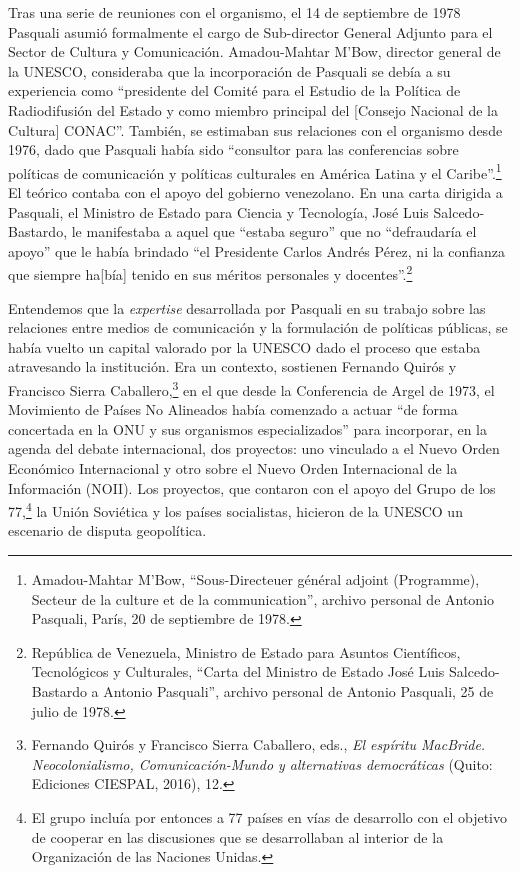 \documentclass{tufte-handout}
\begin{document}
Tras una serie de reuniones con el organismo, el 14 de septiembre de
1978 Pasquali asumió formalmente el cargo de Sub-director General
Adjunto para el Sector de Cultura y Comunicación. Amadou-Mahtar M'Bow,
director general de la UNESCO, consideraba que la incorporación de
Pasquali se debía a su experiencia como ``presidente del Comité para el
Estudio de la Política de Radiodifusión del Estado y como miembro
principal del {[}Consejo Nacional de la Cultura{]} CONAC''. También, se
estimaban sus relaciones con el organismo desde 1976, dado que Pasquali
había sido ``consultor para las conferencias sobre políticas de
comunicación y políticas culturales en América Latina y el
Caribe''.\footnote{Amadou-Mahtar M'Bow, ``Sous-Directeuer général
  adjoint (Programme), Secteur de la culture et de la communication'',
  archivo personal de Antonio Pasquali, París, 20 de septiembre de 1978.}
El teórico contaba con el apoyo del gobierno venezolano. En una carta
dirigida a Pasquali, el Ministro de Estado para Ciencia y Tecnología,
José Luis Salcedo-Bastardo, le manifestaba a aquel que ``estaba seguro''
que no ``defraudaría el apoyo'' que le había brindado ``el Presidente
Carlos Andrés Pérez, ni la confianza que siempre ha{[}bía{]} tenido en
sus méritos personales y docentes''.\footnote{República de Venezuela,
  Ministro de Estado para Asuntos Científicos, Tecnológicos y
  Culturales, ``Carta del Ministro de Estado José Luis Salcedo-Bastardo
  a Antonio Pasquali'', archivo personal de Antonio Pasquali, 25 de
  julio de 1978.}

Entendemos que la \emph{expertise} desarrollada por Pasquali en su
trabajo sobre las relaciones entre medios de comunicación y la
formulación de políticas públicas, se había vuelto un capital valorado
por la UNESCO dado el proceso que estaba atravesando la institución. Era
un contexto, sostienen Fernando Quirós y Francisco Sierra
Caballero,\footnote{Fernando Quirós y Francisco Sierra Caballero, eds.,
  \emph{El espíritu MacBride. Neocolonialismo, Comunicación-Mundo y
  alternativas democráticas} (Quito: Ediciones CIESPAL, 2016), 12.} en
el que desde la Conferencia de Argel de 1973, el Movimiento de Países No
Alineados había comenzado a actuar ``de forma concertada en la ONU y sus
organismos especializados'' para incorporar, en la agenda del debate
internacional, dos proyectos: uno vinculado a el Nuevo Orden Económico
Internacional y otro sobre el Nuevo Orden Internacional de la
Información (NOII). Los proyectos, que contaron con el apoyo del Grupo
de los 77,\footnote{El grupo incluía por entonces a 77 países en vías de
  desarrollo con el objetivo de cooperar en las discusiones que se
  desarrollaban al interior de la Organización de las Naciones Unidas.}
la Unión Soviética y los países socialistas, hicieron de la UNESCO un
escenario de disputa geopolítica.
\end{document}
